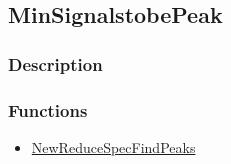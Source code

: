 \subsection{MinSignalstobePeak}\label{MinSignalstobePeak}
\subsubsection{Description}

\subsubsection{Functions}
\begin{itemize}
\item \hyperref[NewReduceSpecFindPeaks]{NewReduceSpecFindPeaks}
\end{itemize}


